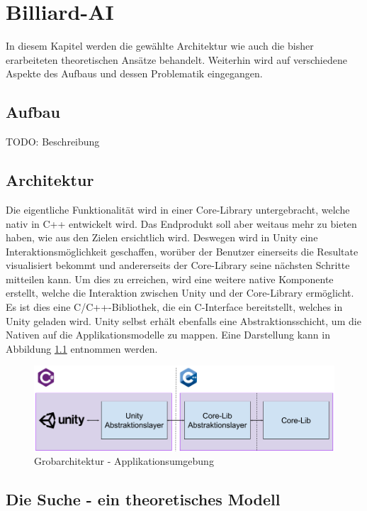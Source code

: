 \chapter{Billiard-AI}
In diesem Kapitel werden die gewählte Architektur wie auch die bisher erarbeiteten theoretischen Ansätze behandelt.
Weiterhin wird auf verschiedene Aspekte des Aufbaus und dessen Problematik eingegangen.

\section{Aufbau}
TODO: Beschreibung

\section{Architektur}
Die eigentliche Funktionalität wird in einer Core-Library untergebracht, welche nativ in C++ entwickelt wird. Das
Endprodukt soll aber weitaus mehr zu bieten haben, wie aus den Zielen ersichtlich wird. Deswegen wird in Unity eine
Interaktionsmöglichkeit geschaffen, worüber der Benutzer einerseits die Resultate visualisiert bekommt und
andererseits der Core-Library seine nächsten Schritte mitteilen kann. Um dies zu erreichen, wird eine weitere native
Komponente erstellt, welche die Interaktion zwischen Unity und der Core-Library ermöglicht. Es ist dies eine C/C++-Bibliothek,
die ein C-Interface bereitstellt, welches in Unity geladen wird. Unity selbst erhält ebenfalls eine Abstraktionsschicht,
um die Nativen auf die Applikationsmodelle zu mappen. Eine Darstellung kann in Abbildung \ref{fig:top-level-architecture} entnommen
werden.

\begin{figure}[h!]
    \begin{center}
        \includegraphics[width=0.8\linewidth]{../common/03_billiard_ai/resources/00_top_level_architecture.png}
    \end{center}
    \caption{Grobarchitektur - Applikationsumgebung}
    \label{fig:top-level-architecture}
\end{figure}

\section{Die Suche - ein theoretisches Modell}